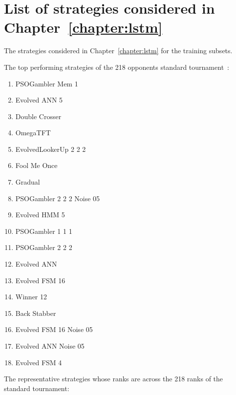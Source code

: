 \section{List of strategies considered in Chapter~\ref{chapter:lstm}}\label{appendix:training_sets_strategies}

The strategies considered in Chapter~\ref{chapter:lstm} for the training subsets.

The top \topstrategies performing strategies of the 218 opponents standard
tournament~\cite{std_tournament_results}:

\begin{multicols}{3}
\begin{enumerate}
    \item PSOGambler Mem 1
    \item Evolved ANN 5
    \item Double Crosser
    \item OmegaTFT
    \item EvolvedLookerUp 2 2 2
    \item Fool Me Once
    \item Gradual
    \item PSOGambler 2 2 2 Noise 05
    \item Evolved HMM 5
    \item PSOGambler 1 1 1
    \item PSOGambler 2 2 2
    \item Evolved ANN
    \item Evolved FSM 16
    \item Winner 12
    \item Back Stabber
    \item Evolved FSM 16 Noise 05
    \item Evolved ANN Noise 05
    \item Evolved FSM 4
\end{enumerate}
\end{multicols}

The \acrossstrategies representative strategies whose ranks are across the 218 ranks
of the standard tournament:

